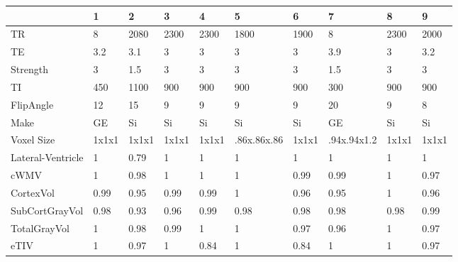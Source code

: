 \begin{table}
[]
\centering
\begin{tabular}{llllllllll}
\toprule
{} &      1 &      2 &      3 &      4 &                     5 &      6 &                     7 &      8 &      9 \\
\midrule
TR                            &      8 &   2080 &   2300 &   2300 &                  1800 &   1900 &                     8 &   2300 &   2000 \\
TE                            &    3.2 &    3.1 &      3 &      3 &                     3 &      3 &                   3.9 &      3 &    3.2 \\
Strength                      &      3 &    1.5 &      3 &      3 &                     3 &      3 &                   1.5 &      3 &      3 \\
TI                            &    450 &   1100 &    900 &    900 &                   900 &    900 &                   300 &    900 &    900 \\
FlipAngle                     &     12 &     15 &      9 &      9 &                     9 &      9 &                    20 &      9 &      8 \\
Make                          &     GE &     Si &     Si &     Si &                    Si &     Si &                    GE &     Si &     Si \\
Voxel Size                    &  1x1x1 &  1x1x1 &  1x1x1 &  1x1x1 &  .86x.86x.86 &  1x1x1 &  .94x.94x1.2 &  1x1x1 &  1x1x1 \\
\bottomrule
Lateral-Ventricle             &      1 &   0.79 &      1 &      1 &                     1 &      1 &                     1 &      1 &      1 \\
cWMV        &      1 &   0.98 &      1 &      1 &                     1 &   0.99 &                  0.99 &      1 &   0.97 \\
CortexVol                     &   0.99 &   0.95 &   0.99 &   0.99 &                     1 &   0.96 &                  0.95 &      1 &   0.96 \\
SubCortGrayVol                &   0.98 &   0.93 &   0.96 &   0.99 &                  0.98 &   0.98 &                  0.98 &   0.98 &   0.99 \\
TotalGrayVol                  &      1 &   0.98 &   0.99 &      1 &                     1 &   0.97 &                  0.96 &      1 &   0.97 \\
eTIV &      1 &   0.97 &      1 &   0.84 &                     1 &   0.84 &                     1 &      1 &   0.97 \\

\end{tabular}
\end{table}
